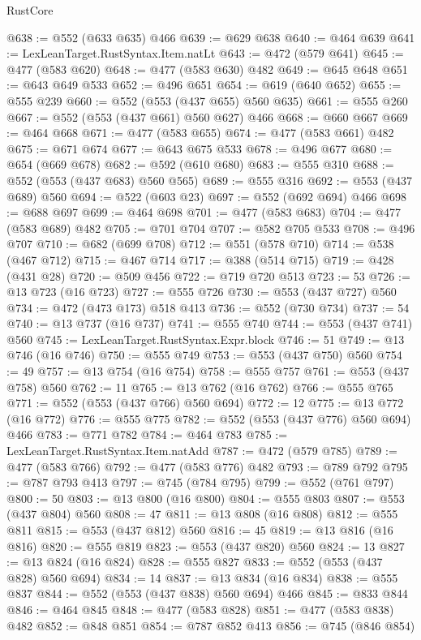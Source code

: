 \begin{lexlean}{RustCore}
\begin{coremodule}
@638 := @552 (@633 @635) @466
@639 := @629 @638
@640 := @464 @639
@641 := LexLeanTarget.RustSyntax.Item.natLt
@643 := @472 (@579 @641)
@645 := @477 (@583 @620)
@648 := @477 (@583 @630) @482
@649 := @645 @648
@651 := @643 @649 @533
@652 := @496 @651
@654 := @619 (@640 @652)
@655 := @555 @239
@660 := @552 (@553 (@437 @655) @560 @635)
@661 := @555 @260
@667 := @552 (@553 (@437 @661) @560 @627) @466
@668 := @660 @667
@669 := @464 @668
@671 := @477 (@583 @655)
@674 := @477 (@583 @661) @482
@675 := @671 @674
@677 := @643 @675 @533
@678 := @496 @677
@680 := @654 (@669 @678)
@682 := @592 (@610 @680)
@683 := @555 @310
@688 := @552 (@553 (@437 @683) @560 @565)
@689 := @555 @316
@692 := @553 (@437 @689) @560
@694 := @522 (@603 @23)
@697 := @552 (@692 @694) @466
@698 := @688 @697
@699 := @464 @698
@701 := @477 (@583 @683)
@704 := @477 (@583 @689) @482
@705 := @701 @704
@707 := @582 @705 @533
@708 := @496 @707
@710 := @682 (@699 @708)
@712 := @551 (@578 @710)
@714 := @538 (@467 @712)
@715 := @467 @714
@717 := @388 (@514 @715)
@719 := @428 (@431 @28)
@720 := @509 @456
@722 := @719 @720 @513
@723 := 53
@726 := @13 @723 (@16 @723)
@727 := @555 @726
@730 := @553 (@437 @727) @560
@734 := @472 (@473 @173) @518 @413
@736 := @552 (@730 @734)
@737 := 54
@740 := @13 @737 (@16 @737)
@741 := @555 @740
@744 := @553 (@437 @741) @560
@745 := LexLeanTarget.RustSyntax.Expr.block
@746 := 51
@749 := @13 @746 (@16 @746)
@750 := @555 @749
@753 := @553 (@437 @750) @560
@754 := 49
@757 := @13 @754 (@16 @754)
@758 := @555 @757
@761 := @553 (@437 @758) @560
@762 := 11
@765 := @13 @762 (@16 @762)
@766 := @555 @765
@771 := @552 (@553 (@437 @766) @560 @694)
@772 := 12
@775 := @13 @772 (@16 @772)
@776 := @555 @775
@782 := @552 (@553 (@437 @776) @560 @694) @466
@783 := @771 @782
@784 := @464 @783
@785 := LexLeanTarget.RustSyntax.Item.natAdd
@787 := @472 (@579 @785)
@789 := @477 (@583 @766)
@792 := @477 (@583 @776) @482
@793 := @789 @792
@795 := @787 @793 @413
@797 := @745 (@784 @795)
@799 := @552 (@761 @797)
@800 := 50
@803 := @13 @800 (@16 @800)
@804 := @555 @803
@807 := @553 (@437 @804) @560
@808 := 47
@811 := @13 @808 (@16 @808)
@812 := @555 @811
@815 := @553 (@437 @812) @560
@816 := 45
@819 := @13 @816 (@16 @816)
@820 := @555 @819
@823 := @553 (@437 @820) @560
@824 := 13
@827 := @13 @824 (@16 @824)
@828 := @555 @827
@833 := @552 (@553 (@437 @828) @560 @694)
@834 := 14
@837 := @13 @834 (@16 @834)
@838 := @555 @837
@844 := @552 (@553 (@437 @838) @560 @694) @466
@845 := @833 @844
@846 := @464 @845
@848 := @477 (@583 @828)
@851 := @477 (@583 @838) @482
@852 := @848 @851
@854 := @787 @852 @413
@856 := @745 (@846 @854)

\end{coremodule}
\end{lexlean}
